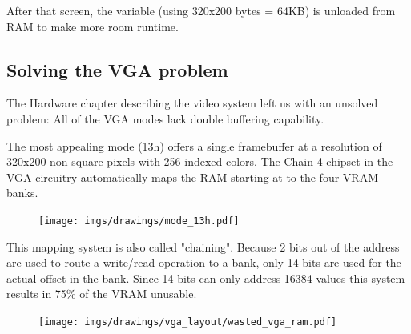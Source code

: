\documentclass[book.tex]{subfiles}
\begin{document}
\begin{minipage}{\textwidth}

\end{minipage}
After that screen, the  variable (using 320x200 bytes = 64KB) is unloaded from RAM to make more room runtime.\\
\par




















\subsection{Solving the VGA problem}
The Hardware chapter describing the video system left us with an unsolved problem: All of the VGA modes lack double buffering capability.\\
\par
 The most appealing mode (13h) offers a single framebuffer at a resolution of 320x200 non-square pixels with 256 indexed colors. The Chain-4 chipset in the VGA circuitry automatically maps the RAM starting at  to the four VRAM banks. 
 \par
 \begin{figure}[H]
\centering
      \texttt{[image: imgs/drawings/mode\_13h.pdf]}
\end{figure}

This mapping system is also called "chaining". Because 2 bits out of the address are used to route a write/read operation to a bank, only 14 bits are used for the actual offset in the bank. Since 14 bits can only address 16384 values this system results in 75\% of the VRAM unusable.\\

\begin{figure}[H]
\centering
 \texttt{[image: imgs/drawings/vga\_layout/wasted\_vga\_ram.pdf]}
 \end{figure}
\end{document}
